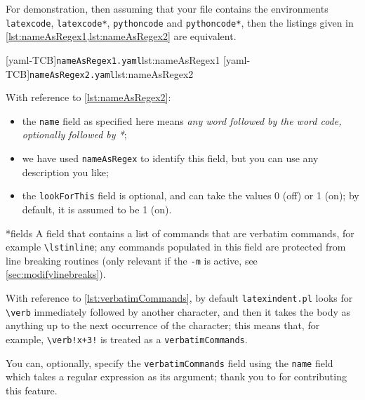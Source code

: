  \begin{example}
 For demonstration, then assuming that your file contains the environments
 \texttt{latexcode}, \texttt{latexcode*}, \texttt{pythoncode} and \texttt{pythoncode*},
 then the listings given in \cref{lst:nameAsRegex1,lst:nameAsRegex2} are equivalent.

 \begin{cmhtcbraster}[raster column skip=.1\linewidth]
  [yaml-TCB]{\texttt{nameAsRegex1.yaml}}{lst:nameAsRegex1}
  [yaml-TCB]{\texttt{nameAsRegex2.yaml}}{lst:nameAsRegex2}
 \end{cmhtcbraster}

 With reference to \cref{lst:nameAsRegex2}:
 \begin{itemize}
  \item the \texttt{name} field as specified here means \emph{any word followed by the
        word code, optionally followed by *};
  \item we have used \texttt{nameAsRegex} to identify this field, but you can use any
        description you like;
  \item the \texttt{lookForThis} field is optional, and can take the values 0 (off) or 1
        (on); by default, it is assumed to be 1 (on).
 \end{itemize}
 \end{example}

*{fields}
 A field that contains a list of commands that are verbatim commands, for example
 \lstinline|\lstinline|; any commands populated in this field are protected from line
 breaking routines (only relevant if the \texttt{-m} is active, see
 \vref{sec:modifylinebreaks}).

 With reference to \cref{lst:verbatimCommands}, by default \texttt{latexindent.pl} looks
 for \lstinline|\verb| immediately followed by another character, and then it takes the
 body as anything up to the next occurrence of the character; this means that, for
 example, \lstinline|\verb!x+3!| is treated as a \texttt{verbatimCommands}.

 You can, optionally, specify  the
 \texttt{verbatimCommands} field using the \texttt{name} field which takes a regular
 expression as its argument; thank you to \cite{XuehaiPan} for contributing this feature.

